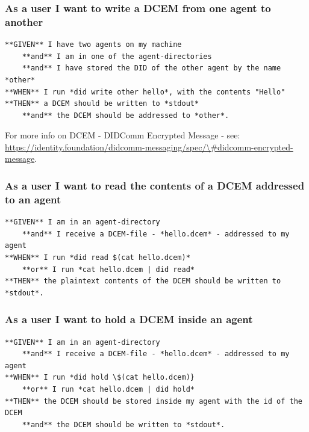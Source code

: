 \hypertarget{as-a-user-i-want-to-write-a-dcem-from-one-agent-to-another}{%
\subsubsection{As a user I want to write a DCEM from one agent to
another}\label{as-a-user-i-want-to-write-a-dcem-from-one-agent-to-another}}

\begin{lstlisting}
**GIVEN** I have two agents on my machine
    **and** I am in one of the agent-directories
    **and** I have stored the DID of the other agent by the name *other*
**WHEN** I run *did write other hello*, with the contents "Hello"
**THEN** a DCEM should be written to *stdout*
    **and** the DCEM should be addressed to *other*.
\end{lstlisting}

For more info on DCEM - DIDComm Encrypted Message - see:
\href{https://identity.foundation/didcomm-messaging/spec/\%5C\%5C\#didcomm-encrypted-message}{https://identity.foundation/didcomm-messaging/spec/\textbackslash\#didcomm-encrypted-message}.

\hypertarget{as-a-user-i-want-to-read-the-contents-of-a-dcem-addressed-to-an-agent}{%
\subsubsection{As a user I want to read the contents of a DCEM addressed
to an
agent}\label{as-a-user-i-want-to-read-the-contents-of-a-dcem-addressed-to-an-agent}}

\begin{lstlisting}
**GIVEN** I am in an agent-directory
    **and** I receive a DCEM-file - *hello.dcem* - addressed to my agent
**WHEN** I run *did read $(cat hello.dcem)*
    **or** I run *cat hello.dcem | did read*
**THEN** the plaintext contents of the DCEM should be written to *stdout*.
\end{lstlisting}

\hypertarget{as-a-user-i-want-to-hold-a-dcem-inside-an-agent}{%
\subsubsection{As a user I want to hold a DCEM inside an
agent}\label{as-a-user-i-want-to-hold-a-dcem-inside-an-agent}}

\begin{lstlisting}
**GIVEN** I am in an agent-directory
    **and** I receive a DCEM-file - *hello.dcem* - addressed to my agent
**WHEN** I run *did hold \$(cat hello.dcem)}
    **or** I run *cat hello.dcem | did hold*
**THEN** the DCEM should be stored inside my agent with the id of the DCEM
    **and** the DCEM should be written to *stdout*.
\end{lstlisting}

